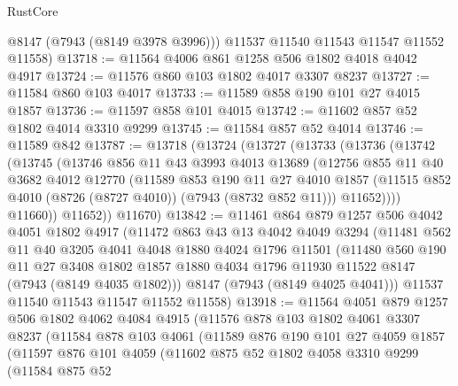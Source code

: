 \begin{lexlean}{RustCore}
\begin{coremodule}
        @8147
        (@7943 (@8149 @3978 @3996)))
      @11537
      @11540
      @11543
      @11547
      @11552
      @11558)
@13718 := @11564 @4006 @861 @1258 @506 @1802 @4018 @4042 @4917
@13724 := @11576 @860 @103 @1802 @4017 @3307 @8237
@13727 := @11584 @860 @103 @4017
@13733 := @11589 @858 @190 @101 @27 @4015 @1857
@13736 := @11597 @858 @101 @4015
@13742 := @11602 @857 @52 @1802 @4014 @3310 @9299
@13745 := @11584 @857 @52 @4014
@13746 := @11589 @842
@13787 := @13718
    (@13724
      (@13727
        (@13733
          (@13736
            (@13742
              (@13745
                (@13746
                  @856
                  @11
                  @43
                  @3993
                  @4013
                  @13689
                  (@12756
                    @855
                    @11
                    @40
                    @3682
                    @4012
                    @12770
                    (@11589
                      @853
                      @190
                      @11
                      @27
                      @4010
                      @1857
                      (@11515 @852 @4010 (@8726 (@8727 @4010)) (@7943 (@8732 @852 @11)))
                      @11652))))
              @11660))
          @11652))
      @11670)
@13842 := @11461
    @864
    @879
    @1257
    @506
    @4042
    @4051
    @1802
    @4917
    (@11472
      @863
      @43
      @13
      @4042
      @4049
      @3294
      (@11481
        @562
        @11
        @40
        @3205
        @4041
        @4048
        @1880
        @4024
        @1796
        @11501
        (@11480
          @560
          @190
          @11
          @27
          @3408
          @1802
          @1857
          @1880
          @4034
          @1796
          @11930
          @11522
          @8147
          (@7943 (@8149 @4035 @1802)))
        @8147
        (@7943 (@8149 @4025 @4041)))
      @11537
      @11540
      @11543
      @11547
      @11552
      @11558)
@13918 := @11564
    @4051
    @879
    @1257
    @506
    @1802
    @4062
    @4084
    @4915
    (@11576
      @878
      @103
      @1802
      @4061
      @3307
      @8237
      (@11584
        @878
        @103
        @4061
        (@11589
          @876
          @190
          @101
          @27
          @4059
          @1857
          (@11597
            @876
            @101
            @4059
            (@11602
              @875
              @52
              @1802
              @4058
              @3310
              @9299
              (@11584
                @875
                @52

\end{coremodule}
\end{lexlean}
